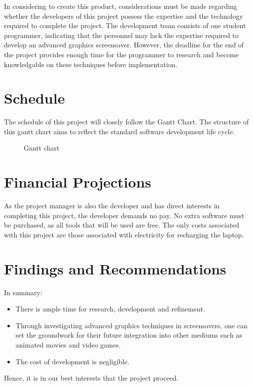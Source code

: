 \documentclass[10pt, openany]{book}
\begin{document}
In considering to create this product, considerations must be made regarding whether the developers of this project possess the expertise and the technology required to complete the project. The development team consists of one student programmer, indicating that the personnel may lack the expertise required to develop an advanced graphics screensaver. However, the deadline for the end of the project provides enough time for the programmer to research and become knowledgable on these techniques before implementation.

\section{Schedule}

The schedule of this project will closely follow the Gantt Chart.
The structure of this gantt chart aims to reflect the standard software development life cycle.

\begin{figure}[H]
	\centering
	\caption{Gantt chart}
	\label{fig:gantt}
\end{figure}	

\section{Financial Projections}

As the project manager is also the developer and has direct interests in completing this project, the developer demands no pay.
No extra software must be purchased, as all tools that will be used are free.
The only costs associated with this project are those associated with electricity for recharging the laptop.

\section{Findings and Recommendations}

In summary:
\begin{itemize}
	\item There is ample time for research, development and refinement.
	\item Through investigating advanced graphics techniques in screensavers, one can set the groundwork for their future integration into other mediums such as animated movies and video games.
	\item The cost of development is negligible.	
\end{itemize}	
Hence, it is in our best interests that the project proceed.
\end{document}
